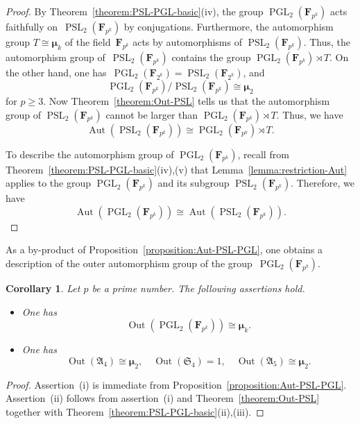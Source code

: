\documentclass[12pt]{amsart}
\numberwithin{equation}{section}
\newtheorem{corollary}[subsection]{Corollary}
\theoremstyle{definition}
\newcommand{\mumu}{\boldsymbol{\mu}}
\DeclareMathOperator{\Aut}{Aut}
\DeclareMathOperator{\Out}{Out}
\DeclareMathOperator{\PGL}{PGL}
\DeclareMathOperator{\PSL}{PSL}
\def \ge {\geqslant}
\begin{document}
\begin{proof}
By Theorem~\ref{theorem:PSL-PGL-basic}(iv), the group $\PGL_2(\mathbf{F}_{p^k})$ acts faithfully on~\mbox{$\PSL_2(\mathbf{F}_{p^k})$} by conjugations.
Furthermore, the automorphism group $T\cong\mumu_k$ of the field~$\mathbf{F}_{p^k}$ acts by automorphisms of $\PSL_2(\mathbf{F}_{p^k})$.
Thus, the automorphism group of~\mbox{$\PSL_2(\mathbf{F}_{p^k})$} contains the group
$\PGL_2(\mathbf{F}_{p^k})\rtimes T$.
On the other hand, one has~\mbox{$\PGL_2(\mathbf{F}_{2^k})=\PSL_2(\mathbf{F}_{2^k})$}, and
$$
\PGL_2(\mathbf{F}_{p^k})/\PSL_2(\mathbf{F}_{p^k})\cong\mumu_2
$$
for $p\ge 3$. Now Theorem~\ref{theorem:Out-PSL}
tells us that the automorphism group of $\PSL_2(\mathbf{F}_{p^k})$
cannot be larger than $\PGL_2(\mathbf{F}_{p^k})\rtimes T$.
Thus, we have
$$
\Aut(\PSL_2(\mathbf{F}_{p^k}))\cong
\PGL_2(\mathbf{F}_{p^k})\rtimes T.
$$

To describe the automorphism group of $\PGL_2(\mathbf{F}_{p^k})$, recall from
Theorem~\ref{theorem:PSL-PGL-basic}(iv),(v) that Lemma~\ref{lemma:restriction-Aut}
applies to the group $\PGL_2(\mathbf{F}_{p^k})$ and its subgroup $\PSL_2(\mathbf{F}_{p^k})$.
Therefore, we have
$$
\Aut(\PGL_2(\mathbf{F}_{p^k}))\cong \Aut(\PSL_2(\mathbf{F}_{p^k})).
$$
\end{proof}


As a by-product of Proposition~\ref{proposition:Aut-PSL-PGL}, one obtains a description of
the outer automorphism group of the group~\mbox{$\PGL_2(\mathbf{F}_{p^k})$}.

\begin{corollary}
\label{corollary:Out-PGL}
Let $p$ be a prime number. The following assertions hold.
\begin{itemize}
\item[(i)] One has
$$
\Out(\PGL_2(\mathbf{F}_{p^k}))\cong \mumu_k.
$$

\item[(ii)] One has
$$
\Out(\mathfrak{A}_4)\cong \mumu_2,\quad
\Out(\mathfrak{S}_4)=1,\quad
\Out(\mathfrak{A}_5)\cong \mumu_2.
$$
\end{itemize}
\end{corollary}

\begin{proof}
Assertion~(i) is immediate from Proposition~\ref{proposition:Aut-PSL-PGL}.
Assertion~(ii) follows from assertion~(i) and Theorem~\ref{theorem:Out-PSL}
together with Theorem~\ref{theorem:PSL-PGL-basic}(ii),(iii).
\end{proof}
\end{document}
